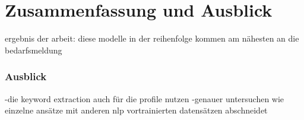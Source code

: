 \chapter{Zusammenfassung und Ausblick}
\label{chap:ergebnisse}

ergebnis der arbeit: diese modelle in der reihenfolge kommen am nähesten an die bedarfsmeldung

\subsection*{Ausblick}
-die keyword extraction auch für die profile nutzen 
-genauer untersuchen wie einzelne ansätze mit anderen nlp vortrainierten datensätzen abschneidet
\newpage
